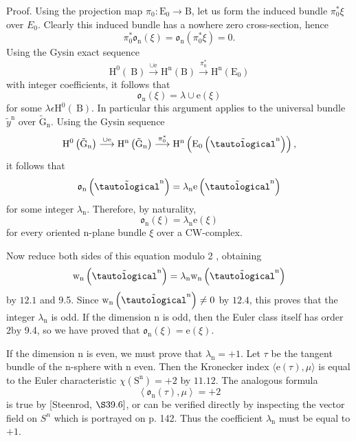 \documentclass[10pt]{article}
\begin{document}
Proof. Using the projection map $\pi_{0}: \mathrm{E}_{0} \rightarrow \mathrm{B}$, let us form the induced bundle $\pi_{0}^{*} \xi$ over $E_{0}$. Clearly this induced bundle has a nowhere zero cross-section, hence
$$
\pi_{0}^{*} \mathfrak{o}_{\mathrm{n}}(\xi)=\mathfrak{o}_{\mathrm{n}}\left(\pi_{0}^{*} \xi\right)=0 .
$$
Using the Gysin exact sequence
$$
\mathrm{H}^{0}(\mathrm{~B}) \stackrel{\cup \mathrm{e}}{\longrightarrow} \mathrm{H}^{\mathrm{n}}(\mathrm{B}) \stackrel{\pi_{0}^{*}}{\longrightarrow} \mathrm{H}^{\mathrm{n}}\left(\mathrm{E}_{0}\right)
$$
with integer coefficients, it follows that
$$
\mathfrak{o}_{\mathrm{n}}(\xi)=\lambda \cup \mathrm{e}(\xi)
$$
for some $\lambda \epsilon \mathrm{H}^{0}(\mathrm{~B})$. In particular this argument applies to the universal bundle $\tilde{y}^{\mathrm{n}}$ over $\widetilde{\mathrm{G}}_{\mathrm{n}}$. Using the Gysin sequence
$$
\mathrm{H}^{0}\left(\tilde{\mathrm{G}}_{\mathrm{n}}\right) \stackrel{\cup \mathrm{e}}{\longrightarrow} \mathrm{H}^{\mathrm{n}}\left(\tilde{\mathrm{G}}_{\mathrm{n}}\right) \stackrel{\pi_{0}^{*}}{\longrightarrow} \mathrm{H}^{\mathrm{n}}\left(\mathrm{E}_{0}\left(\tilde{\tautological}^{\mathrm{n}}\right)\right),
$$
it follows that
$$
\mathfrak{o}_{\mathrm{n}}\left(\tilde{\tautological}^{\mathrm{n}}\right)=\lambda_{\mathrm{n}} \mathrm{e}\left(\tilde{\tautological}^{\mathrm{n}}\right)
$$
for some integer $\lambda_{\mathrm{n}}$. Therefore, by naturality,
$$
\mathfrak{o}_{\mathrm{n}}(\xi)=\lambda_{\mathrm{n}} \mathrm{e}(\xi)
$$
for every oriented n-plane bundle $\xi$ over a CW-complex.

Now reduce both sides of this equation modulo 2 , obtaining
$$
\mathrm{w}_{\mathrm{n}}\left(\tilde{\tautological}^{\mathrm{n}}\right)=\lambda_{\mathrm{n}} \mathrm{w}_{\mathrm{n}}\left(\tilde{\tautological}^{\mathrm{n}}\right)
$$
by $12.1$ and 9.5. Since $\mathrm{w}_{\mathrm{n}}\left(\tilde{\tautological}^{\mathrm{n}}\right) \neq 0$ by $12.4$, this proves that the integer $\lambda_{\mathrm{n}}$ is odd. If the dimension $\mathrm{n}$ is odd, then the Euler class itself has order $2 \mathrm{by}$ 9.4, so we have proved that $\mathfrak{o}_{\mathrm{n}}(\xi)=\mathrm{e}(\xi)$.

If the dimension $\mathrm{n}$ is even, we must prove that $\lambda_{\mathrm{n}}=+1$. Let $\tau$ be the tangent bundle of the $\mathrm{n}$-sphere with $\mathrm{n}$ even. Then the Kronecker index $\langle\mathrm{e}(\tau), \mu\rangle$ is equal to the Euler characteristic $\chi\left(\mathrm{S}^{\mathrm{n}}\right)=+2$ by $11.12 .$ The analogous formula
$$
\left\langle\mathfrak{o}_{\mathrm{n}}(\tau), \mu\right\rangle=+2
$$
is true by [Steenrod, $\S 39.6]$, or can be verified directly by inspecting the vector field on $S^{n}$ which is portrayed on p. 142. Thus the coefficient $\lambda_{\mathrm{n}}$ must be equal to $+1$.
\end{document}
